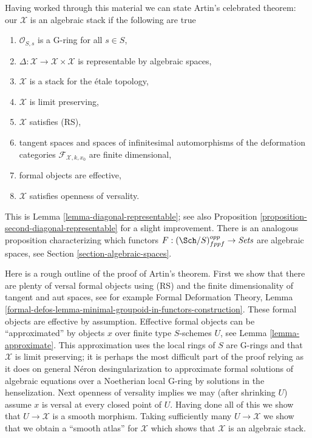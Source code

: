 \medskip\noindent
Having worked through this material we can state Artin's celebrated
theorem: our $\mathcal{X}$ is an algebraic stack if the following are true
\begin{enumerate}
\item $\mathcal{O}_{S, s}$ is a G-ring for all $s \in S$,
\item $\Delta : \mathcal{X} \to \mathcal{X} \times \mathcal{X}$
is representable by algebraic spaces,
\item $\mathcal{X}$ is a stack for the \'etale topology,
\item $\mathcal{X}$ is limit preserving,
\item $\mathcal{X}$ satisfies (RS),
\item tangent spaces and spaces of infinitesimal automorphisms
of the deformation categories $\mathcal{F}_{\mathcal{X}, k, x_0}$
are finite dimensional,
\item formal objects are effective,
\item $\mathcal{X}$ satisfies openness of versality.
\end{enumerate}
This is Lemma \ref{lemma-diagonal-representable}; see also
Proposition \ref{proposition-second-diagonal-representable}
for a slight improvement. There is an analogous proposition
characterizing which functors $F : (\Sch/S)_{fppf}^{opp} \to \textit{Sets}$
are algebraic spaces, see Section \ref{section-algebraic-spaces}.

\medskip\noindent
Here is a rough outline of the proof of Artin's theorem.
First we show that there are plenty of versal formal objects
using (RS) and the finite dimensionality of tangent and aut spaces, see
for example Formal Deformation Theory, Lemma
\ref{formal-defos-lemma-minimal-groupoid-in-functors-construction}.
These formal objects are effective by assumption.
Effective formal objects can be ``approximated'' by objects $x$ over
finite type $S$-schemes $U$, see Lemma \ref{lemma-approximate}.
This approximation uses the local rings of $S$ are G-rings and
that $\mathcal{X}$ is limit preserving; it is perhaps the most difficult
part of the proof relying as it does on general N\'eron desingularization to
approximate formal solutions of algebraic equations over a Noetherian local
G-ring by solutions in the henselization.
Next openness of versality implies we may (after shrinking $U$)
assume $x$ is versal at every closed point of $U$.
Having done all of this we show that $U \to \mathcal{X}$
is a smooth morphism. Taking sufficiently many $U \to \mathcal{X}$
we show that we obtain a ``smooth atlas'' for $\mathcal{X}$ which shows
that $\mathcal{X}$ is an algebraic stack.

